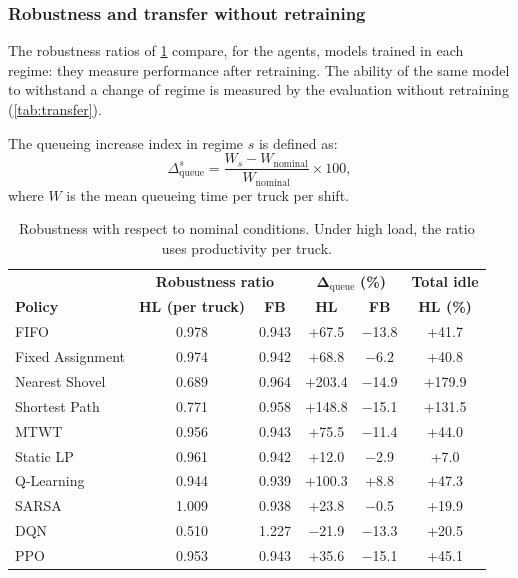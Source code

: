 \documentclass[11pt,a4paper]{article}
\newif\ifrevmarks
\newcommand{\revtag}[1]{\ifrevmarks\textsuperscript{\textcolor{red!70!black}{\scriptsize[#1]}}\fi}
\newenvironment{revbloc}[1]{\par\ifrevmarks\color{revcolor}\noindent\revtag{#1}\ \fi}{\par}
\newif\ifcorrmarks
\newcommand{\corr}[1]{\ifcorrmarks\textcolor{corrcolor}{#1}\else#1\fi}
\begin{document}
\subsubsection{Robustness and transfer without retraining}
\label{sec:robustness}

\begin{revbloc}{T31}
The robustness ratios of \cref{tab:robustness} compare, for the agents, models trained in each regime: they measure performance after retraining. The ability of the same model to withstand a change of regime is measured by the evaluation without retraining (\cref{tab:transfer}).

The queueing increase index in regime $s$ is defined as:
\begin{equation}
\Delta_{\mathrm{queue}}^{s} = \frac{W_{s} - W_{\mathrm{nominal}}}{W_{\mathrm{nominal}}} \times 100 ,
\label{eq:delta_wait}
\end{equation}
where $W$ is the mean queueing time per truck per shift.

\begin{table}[H]
\centering
\caption{Robustness with respect to nominal conditions. Under high load, the ratio uses productivity per truck.}
\label{tab:robustness}
\small
\setlength{\tabcolsep}{4pt}
\begin{tabular}{lcc|cc|c}
\toprule
 & \multicolumn{2}{c|}{\textbf{Robustness ratio}} & \multicolumn{2}{c|}{$\boldsymbol{\Delta_{\mathrm{queue}}}$ \textbf{(\%)}} & \textbf{Total idle} \\
\textbf{Policy} & \textbf{HL (per truck)} & \textbf{FB} & \textbf{HL} & \textbf{FB} & \textbf{HL (\%)} \\
\midrule
FIFO                 & 0.978 & 0.943 & +67.5 & $-$13.8 & +41.7 \\
Fixed Assignment     & 0.974 & 0.942 & +68.8 & $-$6.2 & +40.8 \\
Nearest Shovel       & 0.689 & 0.964 & +203.4 & $-$14.9 & +179.9 \\
Shortest Path        & 0.771 & 0.958 & +148.8 & $-$15.1 & +131.5 \\
MTWT                 & 0.956 & 0.943 & +75.5 & $-$11.4 & +44.0 \\
\corr{Static LP}                   & 0.961 & 0.942 & +12.0 & $-$2.9 & +7.0 \\
\midrule
Q-Learning           & 0.944 & 0.939 & +100.3 & +8.8 & +47.3 \\
SARSA                & 1.009 & 0.938 & +23.8 & $-$0.5 & +19.9 \\
DQN                  & 0.510 & 1.227 & $-$21.9 & $-$13.3 & +20.5 \\
PPO                  & 0.953 & 0.943 & +35.6 & $-$15.1 & +45.1 \\
\bottomrule
\end{tabular}
\end{table}


\end{revbloc}
\end{document}
